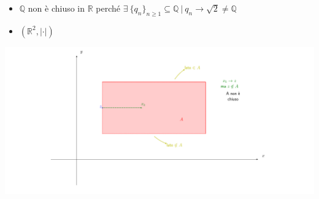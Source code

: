 \begin{exbar}
	\begin{itemize}
		\item $\mathbb{Q}$ non è chiuso in $\mathbb{R}$ perché $\exists \ \{q_n\}_{n\geq 1} \subseteq \mathbb{Q} \ \big| \ q_n \rightarrow \sqrt{2} \neq \mathbb{Q}$
		
		\item $(\mathbb{R}^2, |\cdot|)$
	\end{itemize}	
	\begin{center}
		\includegraphics[width=0.75\linewidth]{spazi_metrici_e_normati/pag159}
		\label{fig:pag159}
	\end{center}	
\end{exbar}


